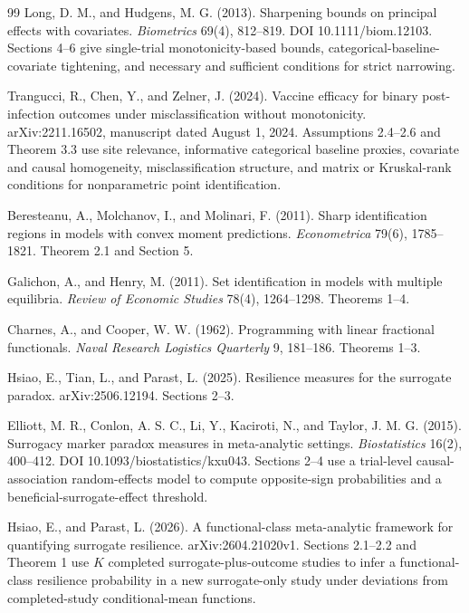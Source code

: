 \documentclass{article}
\begin{document}
\begin{thebibliography}{99}
   Long, D. M., and Hudgens, M. G. (2013). Sharpening bounds on principal effects with covariates. \emph{Biometrics} 69(4), 812--819. DOI 10.1111/biom.12103. Sections 4--6 give single-trial monotonicity-based bounds, categorical-baseline-covariate tightening, and necessary and sufficient conditions for strict narrowing.

   Trangucci, R., Chen, Y., and Zelner, J. (2024). Vaccine efficacy for binary post-infection outcomes under misclassification without monotonicity. arXiv:2211.16502, manuscript dated August 1, 2024. Assumptions 2.4--2.6 and Theorem 3.3 use site relevance, informative categorical baseline proxies, covariate and causal homogeneity, misclassification structure, and matrix or Kruskal-rank conditions for nonparametric point identification.

   Beresteanu, A., Molchanov, I., and Molinari, F. (2011). Sharp identification regions in models with convex moment predictions. \emph{Econometrica} 79(6), 1785--1821. Theorem 2.1 and Section 5.

   Galichon, A., and Henry, M. (2011). Set identification in models with multiple equilibria. \emph{Review of Economic Studies} 78(4), 1264--1298. Theorems 1--4.

   Charnes, A., and Cooper, W. W. (1962). Programming with linear fractional functionals. \emph{Naval Research Logistics Quarterly} 9, 181--186. Theorems 1--3.

   Hsiao, E., Tian, L., and Parast, L. (2025). Resilience measures for the surrogate paradox. arXiv:2506.12194. Sections 2--3.

   Elliott, M. R., Conlon, A. S. C., Li, Y., Kaciroti, N., and Taylor, J. M. G. (2015). Surrogacy marker paradox measures in meta-analytic settings. \emph{Biostatistics} 16(2), 400--412. DOI 10.1093/biostatistics/kxu043. Sections 2--4 use a trial-level causal-association random-effects model to compute opposite-sign probabilities and a beneficial-surrogate-effect threshold.

   Hsiao, E., and Parast, L. (2026). A functional-class meta-analytic framework for quantifying surrogate resilience. arXiv:2604.21020v1. Sections 2.1--2.2 and Theorem 1 use \(K\) completed surrogate-plus-outcome studies to infer a functional-class resilience probability in a new surrogate-only study under deviations from completed-study conditional-mean functions.


\end{thebibliography}
\end{document}
